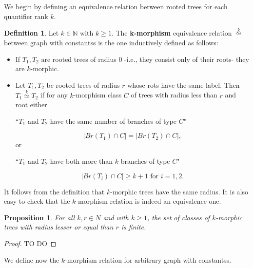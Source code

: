 \documentclass[11pt,notitlepage]{report}
\newtheorem{proposition}{Proposition}[chapter]
\theoremstyle{definition}
\newtheorem{definition}{Definition}[chapter]
\newcommand{\N}{\mathbb{N}}
\newcommand{\clist}{\mathfrak{c}_{1}, \cdots, \mathfrak{c}_m}
\newcommand{\morph}[1]{\stackrel{#1}{\simeq}}
\begin{document}
We begin by defining an equivalence relation between rooted 
trees for each quantifier rank $k$.

\begin{definition} 
	Let $k\in \N$ with $k\geq 1$. The \textbf{k-morphism} equivalence relation
	$\morph{k}$ between
	graph with constantss is the one inductively defined as follows:
	\begin{itemize}
		\item If $T_1, T_2$ are rooted trees of radius $0$ -i.e., they
		consist only of their roots- they are $k$-morphic. 
		\item Let $T_1, T_2$ be rooted trees of radius $r$ whose 
		rots have the same label. Then $T_1 \morph{k} T_2$ if 
		for any $k$-morphism class $C$ of trees with
		radius less than $r$ and root either
		\begin{center}
			\vspace{-0.2cm}
			``$T_1$ and $T_2$ have the same number of branches of type $C$"
		\end{center}
		\vspace{-0.3cm}
		\[ |Br(T_1)\cap C| = |Br(T_2)\cap C|,\]
		or 
		\begin{center}
			\vspace{-0.2cm}
			``$T_1$ and $T_2$ have both more than $k$ branches of type $C$"
		\end{center}
	\vspace{-0.3cm}
		\[ |Br(T_i)\cap C| \geq k+1 \text{ for } i=1,2. \]
	\end{itemize} 
\end{definition}

It follows from the definition that $k$-morphic trees have the same radius. 
It is also easy to check that the $k$-morphism relation is indeed an equivalence one. 

\begin{proposition}
	For all $k,r\in N$ and with $k\geq 1$, the set of classes of $k$-morphic trees
	with radius lesser or equal than $r$ is finite.
\end{proposition}
\begin{proof}
TO DO
\end{proof}

We define now the $k$-morphism relation for arbitrary graph with constantss. 
\end{document}
